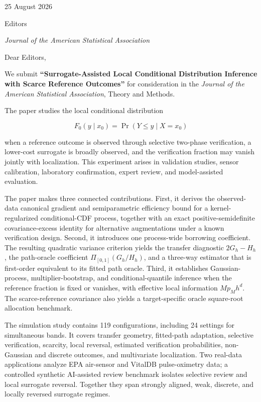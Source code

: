 \documentclass[
  10pt,
]{article}
\author{}
\date{}
\begin{document}
25 August 2026

Editors

\emph{Journal of the American Statistical Association}

Dear Editors,

We submit \textbf{``Surrogate-Assisted Local Conditional Distribution
Inference with Scarce Reference Outcomes''} for consideration in the
\emph{Journal of the American Statistical Association}, Theory and
Methods.

The paper studies the local conditional distribution

\[
F_0(y\mid x_0)=\Pr(Y\le y\mid X=x_0)
\]

when a reference outcome is observed through selective two-phase
verification, a lower-cost surrogate is broadly observed, and the
verification fraction may vanish jointly with localization. This
experiment arises in validation studies, sensor calibration, laboratory
confirmation, expert review, and model-assisted evaluation.

The paper makes three connected contributions. First, it derives the
observed-data canonical gradient and semiparametric efficiency bound for
a kernel-regularized conditional-CDF process, together with an exact
positive-semidefinite covariance-excess identity for alternative
augmentations under a known verification design. Second, it introduces
one process-wide borrowing coefficient. The resulting quadratic variance
criterion yields the transfer diagnostic \(2G_h-H_h\), the path-oracle
coefficient \(\Pi_{[0,1]}(G_h/H_h)\), and a three-way estimator that is
first-order equivalent to its fitted path oracle. Third, it establishes
Gaussian-process, multiplier-bootstrap, and conditional-quantile
inference when the reference fraction is fixed or vanishes, with
effective local information \(Mp_Mh^d\). The scarce-reference covariance
also yields a target-specific oracle square-root allocation benchmark.

The simulation study contains 119 configurations, including 24 settings
for simultaneous bands. It covers transfer geometry, fitted-path
adaptation, selective verification, scarcity, local reversal, estimated
verification probabilities, non-Gaussian and discrete outcomes, and
multivariate localization. Two real-data applications analyze EPA
air-sensor and VitalDB pulse-oximetry data; a controlled synthetic
AI-assisted review benchmark isolates selective review and local
surrogate reversal. Together they span strongly aligned, weak, discrete,
and locally reversed surrogate regimes.
\end{document}
